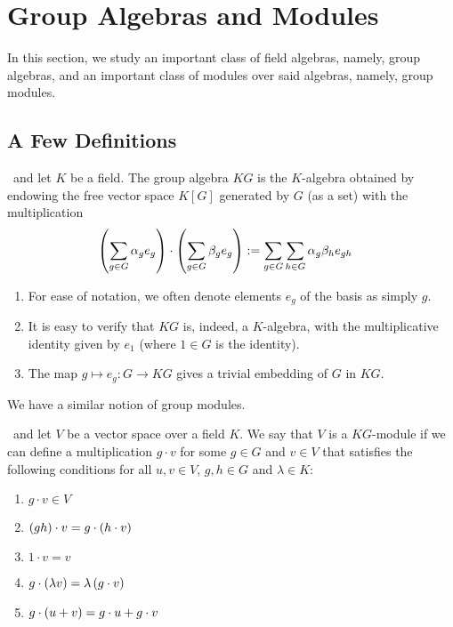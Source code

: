 \section{Group Algebras and Modules}

In this section, we study an important class of field algebras, namely, group algebras, and an important class of modules over said algebras, namely, group modules.

\subsection{A Few Definitions}

\begin{boxdefinition}
    \ and let $K$ be a field. The group algebra $KG$ is the $K$-algebra obtained by endowing the free vector space $K[G]$ generated by $G$ (as a set) with the multiplication
    \begin{align*}
        \left( \sum_{g \in G} \alpha_g e_g \right) \cdot \left( \sum_{g \in G} \beta_g e_g \right) &:= \sum_{g \in G} \sum_{h \in G} \alpha_{g} \beta_h e_{gh}
    \end{align*}
\end{boxdefinition}
\begin{remark} \hfill
    \begin{enumerate}[noitemsep]
        \item For ease of notation, we often denote elements $e_g$ of the basis as simply $g$.
        \item It is easy to verify that $KG$ is, indeed, a $K$-algebra, with the multiplicative identity given by $e_1$ (where $1 \in G$ is the identity).
        \item The map $g \mapsto e_g : G \to KG$ gives a trivial embedding of $G$ in $KG$.
    \end{enumerate}
\end{remark}

We have a similar notion of group modules.

\begin{boxdefinition}
    \ and let $V$ be a vector space over a field $K$. We say that $V$ is a $KG$-module if we can define a multiplication $g \cdot v$ for some $g \in G$ and $v \in V$ that satisfies the following conditions for all $u, v \in V$, $g, h \in G$ and $\lambda \in K$:
    \begin{enumerate}[noitemsep]
        \item $g \cdot v \in V$
        \item $\left( gh \right) \cdot v = g \cdot \left( h \cdot v \right)$
        \item $1 \cdot v = v$
        \item $g \cdot \left( \lambda v \right) = \lambda \left( g \cdot v \right)$
        \item $g \cdot \left( u + v \right) = g \cdot u + g \cdot v$
    \end{enumerate}
\end{boxdefinition}

